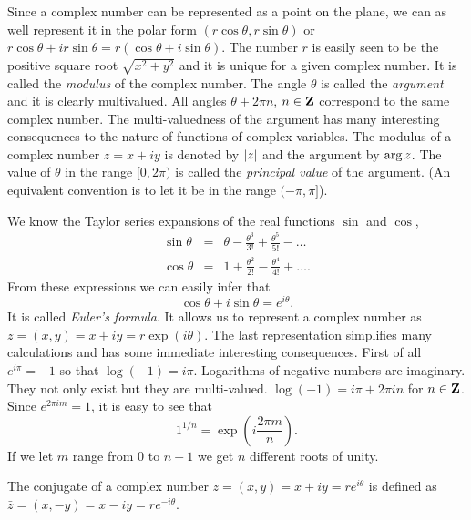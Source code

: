 Since a complex number can be represented as a point on the plane, we can
as well represent it in the polar form $(r\cos\theta, r\sin\theta)$ or
$r\cos\theta + ir\sin\theta = r(\cos\theta + i\sin\theta)$. The number $r$
is easily seen to be the positive square root $\sqrt{x^2 + y^2}$ and it is
unique for a given complex number. It is called the \emph{modulus} of the
complex number. The angle $\theta$ is called the \emph{argument} and it is
clearly multivalued. All angles $\theta + 2\pi n$, $n \in \mathbf{Z}$ correspond to
the same complex number. The multi-valuedness of the argument has many 
interesting consequences to the nature of functions of complex variables. The
modulus of a complex number $z = x + iy$ is denoted by $\left\vert{z}\right\vert$ and the
argument by $\operatorname{arg}{z}$. The value of $\theta$ in the range $[0, 2\pi)$ is called
the \emph{principal value} of the argument. (An equivalent convention is to let
it be in the range $(-\pi, \pi]$).

We know the Taylor series expansions of the real functions $\sin$ and $\cos$,
\begin{eqnarray*}
\sin\theta &=& \theta - \frac{\theta^3}{3!} + \frac{\theta^5}{5!} - \ldots \\
\cos\theta &=& 1 + \frac{\theta^2}{2!} - \frac{\theta^4}{4!} + \ldots.
\end{eqnarray*}
From these expressions we can easily infer that
\begin{equation}\label{c1s2e1}
\cos\theta + i\sin\theta = e^{i\theta}.
\end{equation}
It is called \emph{Euler's formula}. It allows us to represent a complex number
as $z = (x, y) = x + iy = r\exp(i\theta)$. The last representation simplifies
many calculations and has some immediate interesting consequences. First of all
$e^{i\pi} = -1$ so that $\log(-1) = i\pi$. Logarithms of negative numbers are
imaginary. They not only exist but they are multi-valued. $\log(-1) = i\pi + 
2\pi in$ for $n \in \mathbf{Z}$. Since $e^{2\pi im} = 1$, it is easy to see 
that 
\[
1^{1/n} = \exp\left(i\frac{2\pi m}{n}\right).
\]
If we let $m$ range from $0$ to $n - 1$ we get $n$ different roots of unity.

The conjugate of a complex number $z = (x, y) = x + iy = re^{i\theta}$ is
defined as $\bar{z} = (x, -y) = x - iy = re^{-i\theta}$.

